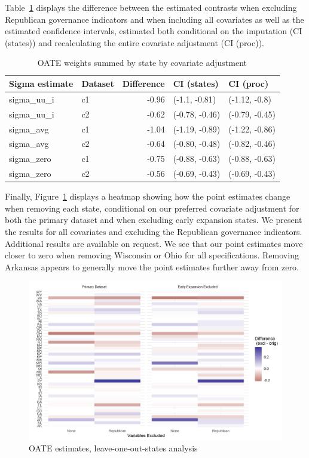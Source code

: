 \documentclass[12pt]{article}
\begin{document}
Table~\ref{tab:oaterepubdiff} displays the difference between the estimated contrasts when excluding Republican governance indicators and when including all covariates as well as the estimated confidence intervals, estimated both conditional on the imputation (CI (states)) and recalculating the entire covariate adjustment (CI (proc)).

\begin{table}[ht]
\centering
\begin{tabular}{llrll}
  \toprule
Sigma estimate & Dataset & Difference & CI (states) & CI (proc) \\ 
  \midrule
sigma\_uu\_i & c1 & -0.96 & (-1.1, -0.81) & (-1.12, -0.8) \\ 
  sigma\_uu\_i & c2 & -0.62 & (-0.78, -0.46) & (-0.79, -0.45) \\ 
  sigma\_avg & c1 & -1.04 & (-1.19, -0.89) & (-1.22, -0.86) \\ 
  sigma\_avg & c2 & -0.64 & (-0.80, -0.48) & (-0.82, -0.46) \\ 
  sigma\_zero & c1 & -0.75 & (-0.88, -0.63) & (-0.88, -0.63) \\ 
  sigma\_zero & c2 & -0.56 & (-0.69, -0.43) & (-0.69, -0.43) \\ 
   \bottomrule
\end{tabular}
\caption{OATE weights summed by state by covariate adjustment}
\label{tab:oaterepubdiff}
\end{table}

Finally, Figure~\ref{fig:oateheatmap} displays a heatmap showing how the point estimates change when removing each state, conditional on our preferred covariate adjustment for both the primary dataset and when excluding early expansion states. We present the results for all covariates and excluding the Republican governance indicators. Additional results are available on request. We see that our point estimates move closer to zero when removing Wisconsin or Ohio for all specifications. Removing Arkansas appears to generally move the point estimates further away from zero.

\begin{figure}[]
\begin{center}
    \includegraphics[scale=0.6]{01_Plots/oate-loo-state-cov-group-heatmap-states.png}
    \caption{OATE estimates, leave-one-out-states analysis}
    \label{fig:oateheatmap}
\end{center}
\end{figure}
\end{document}
